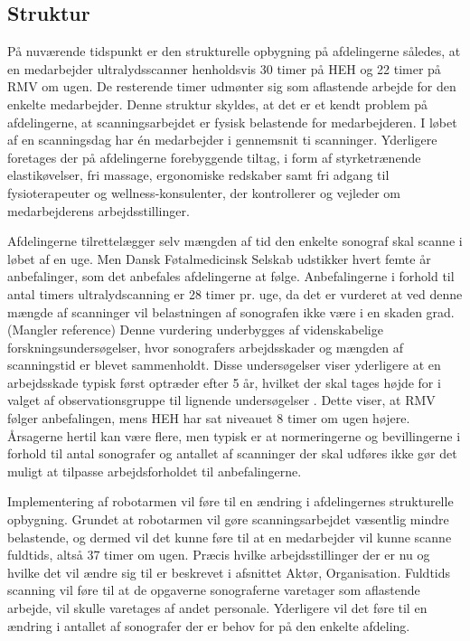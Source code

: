 \subsection{Struktur}
På nuværende tidspunkt er den strukturelle opbygning på afdelingerne således, at en medarbejder ultralydsscanner henholdsvis 30 timer på HEH og 22 timer på RMV om ugen. De resterende timer udmønter sig som aflastende arbejde for den enkelte medarbejder. Denne struktur skyldes, at det er et kendt problem på afdelingerne, at scanningsarbejdet er fysisk belastende for medarbejderen. I løbet af en scanningsdag har én medarbejder i gennemsnit ti scanninger. Yderligere foretages der på afdelingerne forebyggende tiltag, i form af styrketrænende elastikøvelser, fri massage, ergonomiske redskaber samt fri adgang til fysioterapeuter og wellness-konsulenter, der kontrollerer og vejleder om medarbejderens arbejdsstillinger.

Afdelingerne tilrettelægger selv mængden af tid den enkelte sonograf skal scanne i løbet af en uge. Men Dansk Føtalmedicinsk Selskab udstikker hvert femte år anbefalinger, som det anbefales afdelingerne at følge. Anbefalingerne i forhold til antal timers ultralydscanning er 28 timer pr. uge, da det er vurderet at ved denne mængde af scanninger vil belastningen af sonografen ikke være i en skaden grad. (Mangler reference) Denne vurdering underbygges af videnskabelige forskningsundersøgelser, hvor sonografers arbejdsskader og mængden af scanningstid er blevet sammenholdt. Disse undersøgelser viser yderligere at en arbejdsskade typisk først optræder efter 5 år, hvilket der skal tages højde for i valget af observationsgruppe til lignende undersøgelser \cite{35}.
Dette viser, at RMV følger anbefalingen, mens HEH har sat niveauet 8 timer om ugen højere. Årsagerne hertil kan være flere, men typisk er at normeringerne og bevillingerne i forhold til antal sonografer og antallet af scanninger der skal udføres ikke gør det muligt at tilpasse arbejdsforholdet til anbefalingerne. 

Implementering af robotarmen vil føre til en ændring i afdelingernes strukturelle opbygning. Grundet at robotarmen vil gøre scanningsarbejdet væsentlig mindre belastende, og dermed vil det kunne føre til at en medarbejder vil kunne scanne fuldtids, altså 37 timer om ugen. Præcis hvilke arbejdsstillinger der er nu og hvilke det vil ændre sig til er beskrevet i afsnittet Aktør, Organisation. Fuldtids scanning vil føre til at de opgaverne sonograferne varetager som aflastende arbejde, vil skulle varetages af andet personale. Yderligere vil det føre til en ændring i antallet af sonografer der er behov for på den enkelte afdeling.

